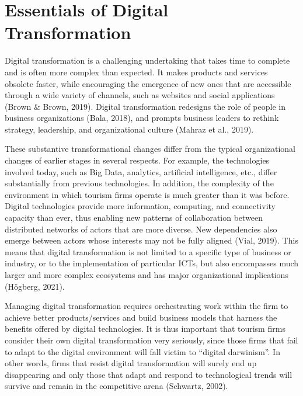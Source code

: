 \documentclass[
  letterpaper,
  DIV=11,
  numbers=noendperiod]{scrreprt}
\begin{document}
\hypertarget{essentials-of-digital-transformation}{%
\section{Essentials of Digital
Transformation}\label{essentials-of-digital-transformation}}

Digital transformation is a challenging undertaking that takes time to
complete and is often more complex than expected. It makes products and
services obsolete faster, while encouraging the emergence of new ones
that are accessible through a wide variety of channels, such as websites
and social applications (Brown \& Brown, 2019). Digital transformation
redesigns the role of people in business organizations (Bala, 2018), and
prompts business leaders to rethink strategy, leadership, and
organizational culture (Mahraz et al., 2019).

These substantive transformational changes differ from the typical
organizational changes of earlier stages in several respects. For
example, the technologies involved today, such as Big Data, analytics,
artificial intelligence, etc., differ substantially from previous
technologies. In addition, the complexity of the environment in which
tourism firms operate is much greater than it was before. Digital
technologies provide more information, computing, and connectivity
capacity than ever, thus enabling new patterns of collaboration between
distributed networks of actors that are more diverse. New dependencies
also emerge between actors whose interests may not be fully aligned
(Vial, 2019). This means that digital transformation is not limited to a
specific type of business or industry, or to the implementation of
particular ICTs, but also encompasses much larger and more complex
ecosystems and has major organizational implications (Högberg, 2021).

Managing digital transformation requires orchestrating work within the
firm to achieve better products/services and build business models that
harness the benefits offered by digital technologies. It is thus
important that tourism firms consider their own digital transformation
very seriously, since those firms that fail to adapt to the digital
environment will fall victim to ``digital darwinism''. In other words,
firms that resist digital transformation will surely end up disappearing
and only those that adapt and respond to technological trends will
survive and remain in the competitive arena (Schwartz, 2002).
\end{document}
